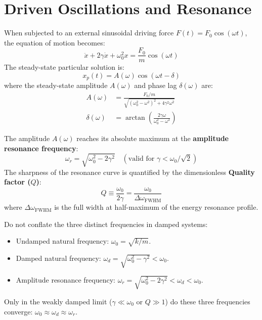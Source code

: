 \section{Driven Oscillations and Resonance}
When subjected to an external sinusoidal driving force $F(t) = F_0 \cos(\omega t)$, the equation of motion becomes:
\begin{equation}
\ddot{x} + 2\gamma\dot{x} + \omega_0^2 x = \frac{F_0}{m}\cos(\omega t)
\end{equation}
The steady-state particular solution is:
\begin{equation}
x_p(t) = A(\omega)\cos(\omega t - \delta)
\end{equation}
where the steady-state amplitude $A(\omega)$ and phase lag $\delta(\omega)$ are:
\begin{align}
A(\omega) &= \frac{F_0/m}{\sqrt{(\omega_0^2 - \omega^2)^2 + 4\gamma^2\omega^2}} \\
\delta(\omega) &= \arctan\left(\frac{2\gamma\omega}{\omega_0^2 - \omega^2}\right)
\end{align}

\begin{mathdefinition}
The amplitude $A(\omega)$ reaches its absolute maximum at the \textbf{amplitude resonance frequency}:
\begin{equation}
\omega_r = \sqrt{\omega_0^2 - 2\gamma^2} \quad (\text{valid for } \gamma < \omega_0/\sqrt{2})
\end{equation}
The sharpness of the resonance curve is quantified by the dimensionless \textbf{Quality factor ($Q$)}:
\begin{equation}
Q \equiv \frac{\omega_0}{2\gamma} = \frac{\omega_0}{\Delta\omega_{\text{FWHM}}}
\end{equation}
where $\Delta\omega_{\text{FWHM}}$ is the full width at half-maximum of the energy resonance profile.
\end{mathdefinition}

\begin{pitfallbox}
Do not conflate the three distinct frequencies in damped systems:
\begin{itemize}
    \item Undamped natural frequency: $\omega_0 = \sqrt{k/m}$.
    \item Damped natural frequency: $\omega_d = \sqrt{\omega_0^2 - \gamma^2} < \omega_0$.
    \item Amplitude resonance frequency: $\omega_r = \sqrt{\omega_0^2 - 2\gamma^2} < \omega_d < \omega_0$.
\end{itemize}
Only in the weakly damped limit ($\gamma \ll \omega_0$ or $Q \gg 1$) do these three frequencies converge: $\omega_0 \approx \omega_d \approx \omega_r$.
\end{pitfallbox}

